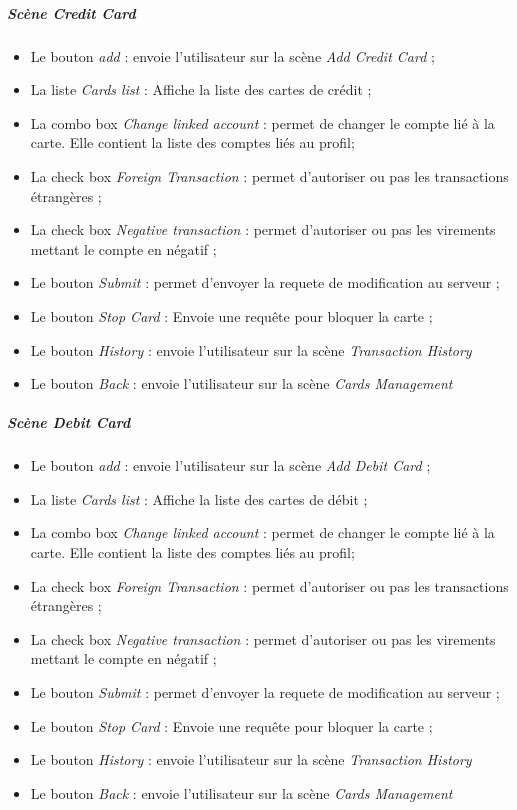 \documentclass{article}
\newcommand{\navbutton}[2]{Le bouton \emph{#1} : envoie l'utilisateur sur la scène \emph{#2}}
\begin{document}
\subparagraph{Scène \emph{Credit Card}}
\begin{itemize}
\item \navbutton{add}{Add Credit Card} ;
\item La liste \emph{Cards list} : Affiche la liste des cartes de crédit ;
\item La combo box \emph{Change linked account} : permet de changer le compte lié à la carte. Elle 
contient la liste des comptes liés au profil;
\item La check box \emph{Foreign Transaction} : permet d'autoriser ou pas les transactions étrangères ;
\item La check box \emph{Negative transaction} : permet d'autoriser ou pas les virements mettant le compte en négatif ;
\item Le bouton \emph{Submit} : permet d'envoyer la requete de modification au serveur ;
\item Le bouton \emph{Stop Card} : Envoie une requête pour bloquer la carte ;
\item \navbutton{History}{Transaction History}
\item \navbutton{Back}{Cards Management}
\end{itemize}

\subparagraph{Scène \emph{Debit Card}}
\begin{itemize}
\item \navbutton{add}{Add Debit Card} ;
\item La liste \emph{Cards list} : Affiche la liste des cartes de débit ;
\item La combo box \emph{Change linked account} : permet de changer le compte lié à la carte. Elle 
contient la liste des comptes liés au profil;
\item La check box \emph{Foreign Transaction} : permet d'autoriser ou pas les transactions étrangères ;
\item La check box \emph{Negative transaction} : permet d'autoriser ou pas les virements mettant le compte en négatif ;
\item Le bouton \emph{Submit} : permet d'envoyer la requete de modification au serveur ;
\item Le bouton \emph{Stop Card} : Envoie une requête pour bloquer la carte ;
\item \navbutton{History}{Transaction History}
\item \navbutton{Back}{Cards Management}
\end{itemize}
\end{document}
